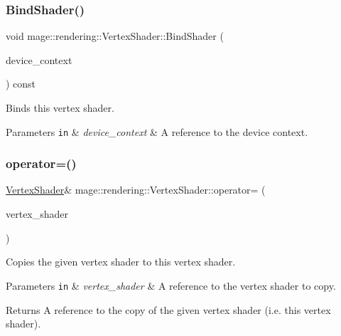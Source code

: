 \subsubsection{\texorpdfstring{Bind\+Shader()}{BindShader()}}
{\footnotesize\ttfamily void mage\+::rendering\+::\+Vertex\+Shader\+::\+Bind\+Shader (\begin{DoxyParamCaption}\item[{I\+D3\+D11\+Device\+Context \&}]{device\+\_\+context }\end{DoxyParamCaption}) const\hspace{0.3cm}{\ttfamily [noexcept]}}

Binds this vertex shader.


\begin{DoxyParams}[1]{Parameters}
\mbox{\tt in}  & {\em device\+\_\+context} & A reference to the device context. \\
\hline
\end{DoxyParams}
\mbox{\label{classmage_1_1rendering_1_1_vertex_shader_a4dff0bd19a0242300fbde0cc0a4497c4}} 
\subsubsection{\texorpdfstring{operator=()}{operator=()}\hspace{0.1cm}{\footnotesize\ttfamily [1/2]}}
{\footnotesize\ttfamily \mbox{\hyperlink{classmage_1_1rendering_1_1_vertex_shader}{Vertex\+Shader}}\& mage\+::rendering\+::\+Vertex\+Shader\+::operator= (\begin{DoxyParamCaption}\item[{const \mbox{\hyperlink{classmage_1_1rendering_1_1_vertex_shader}{Vertex\+Shader}} \&}]{vertex\+\_\+shader }\end{DoxyParamCaption})\hspace{0.3cm}{\ttfamily [delete]}}

Copies the given vertex shader to this vertex shader.


\begin{DoxyParams}[1]{Parameters}
\mbox{\tt in}  & {\em vertex\+\_\+shader} & A reference to the vertex shader to copy. \\
\hline
\end{DoxyParams}
\begin{DoxyReturn}{Returns}
A reference to the copy of the given vertex shader (i.\+e. this vertex shader). 
\end{DoxyReturn}
\mbox{\label{classmage_1_1rendering_1_1_vertex_shader_a2d63073a65a136f2afa898af67eedb8b}} 
